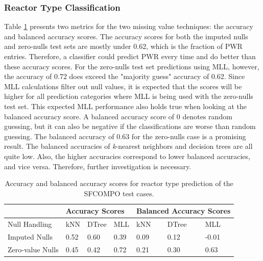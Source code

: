\subsubsection{Reactor Type Classification}

Table \ref{tbl:sfcorxtr} presents two metrics for the two missing value
techniques: the accuracy and balanced accuracy scores. The accuracy scores for
both the imputed nulls and zero-nulls test sets are mostly under 0.62, which is
the fraction of \gls{PWR} entries.  Therefore, a classifier could predict
\gls{PWR} every time and do better than these accuracy scores.  For the
zero-nulls test set predictions using \gls{MLL}, however, the accuracy of 0.72
does exceed the "majority guess" accuracy of 0.62.  Since \gls{MLL}
calculations filter out null values, it is expected that the scores will be
higher for all prediction categories where \gls{MLL} is being used with the
zero-nulls test set. This expected \gls{MLL} performance also holds true when
looking at the balanced accuracy score.  A balanced accuracy score of 0 denotes
random guessing, but it can also be negative if the classifications are worse
than random guessing. The balanced accuracy of 0.63 for the zero-nulls case is
a promising result. The balanced accuracies of \textit{k}-nearest neighbors and
decision trees are all quite low. Also, the higher accuracies correspond to lower
balanced accuracies, and vice versa. Therefore, further investigation is
necessary.

\begin{table}[!htb]
  \centering
  \begin{tabular}{@{}m{1.5in}llllll@{}}
    \toprule
    & \multicolumn{3}{m{2in}}{Accuracy Scores} 
    & \multicolumn{3}{l}{Balanced Accuracy Scores} \\ 
    \toprule
    Null Handling    & kNN   & DTree  & MLL   & kNN   & DTree  & MLL    \\ \midrule
    Imputed Nulls    & 0.52  & 0.60   & 0.39  & 0.09  & 0.12   & -0.01  \\
    Zero-value Nulls & 0.45  & 0.42   & 0.72  & 0.21  & 0.30   & 0.63   \\ \bottomrule
    \end{tabular}
  \caption{Accuracy and balanced accuracy scores for reactor type prediction 
           of the \gls{SFCOMPO} test cases.}
  \label{tbl:sfcorxtr}
\end{table}

